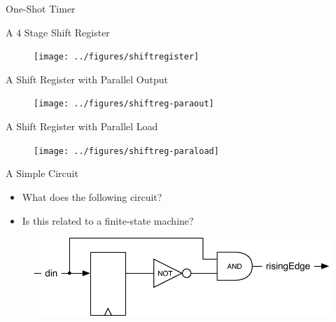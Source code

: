 \begin{frame}[fragile]{One-Shot Timer}
\end{frame}

\begin{frame}[fragile]{A 4 Stage Shift Register}
\begin{figure}
  \texttt{[image: ../figures/shiftregister]}
\end{figure}
\end{frame}


\begin{frame}[fragile]{A Shift Register with Parallel Output}
\begin{figure}
  \texttt{[image: ../figures/shiftreg-paraout]}
\end{figure}
\end{frame}

\begin{frame}[fragile]{A Shift Register with Parallel Load}
\begin{figure}
  \texttt{[image: ../figures/shiftreg-paraload]}
\end{figure}
\end{frame}


\begin{frame}[fragile]{A Simple Circuit}
\begin{itemize}
\item What does the following circuit?
\item Is this related to a finite-state machine?
\end{itemize}
\begin{figure}
  \includegraphics[scale=\scale]{../figures/fsm-rising}
\end{figure}
\end{frame}

